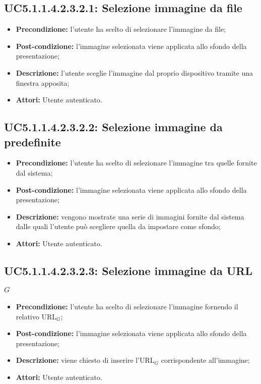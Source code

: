 \subsection{ UC5.1.1.4.2.3.2.1: Selezione immagine da file}

\begin{itemize}
	\item \textbf{Precondizione:} l’utente ha scelto di selezionare l’immagine da file;
	\item \textbf{Post-condizione:} l’immagine selezionata viene applicata allo sfondo della presentazione;
	\item \textbf{Descrizione:} l’utente sceglie l’immagine dal proprio dispositivo tramite una finestra apposita;
	\item \textbf{Attori:} Utente autenticato.
\end{itemize}
\subsection{ UC5.1.1.4.2.3.2.2: Selezione immagine da predefinite}

\begin{itemize}
	\item \textbf{Precondizione:} l’utente ha scelto di selezionare l’immagine tra quelle fornite dal sistema;
	\item \textbf{Post-condizione:} l’immagine selezionata viene applicata allo sfondo della presentazione;
	\item \textbf{Descrizione:} vengono mostrate una serie di immagini fornite dal sistema dalle quali l’utente può scegliere quella da impostare come sfondo;
	\item \textbf{Attori:} Utente autenticato.
\end{itemize}
\subsection{ UC5.1.1.4.2.3.2.3: Selezione immagine da URL$_G$}

\begin{itemize}
	\item \textbf{Precondizione:} l’utente ha scelto di selezionare l’immagine fornendo il relativo URL$_G$;
	\item \textbf{Post-condizione:} l’immagine selezionata viene applicata allo sfondo della presentazione;
	\item \textbf{Descrizione:} viene chiesto di inserire l’URL$_G$ corrispondente all'immagine;
	\item \textbf{Attori:} Utente autenticato.
\end{itemize}

